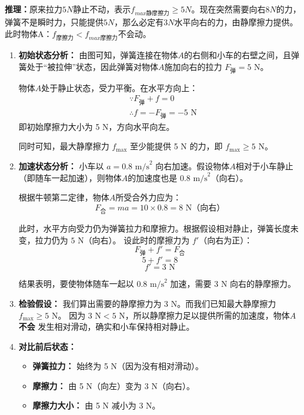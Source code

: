 \documentclass[CJKmath=true,10pt]{MyBook}
\begin{document}
\textbf{推理：}原来拉力$5N$静止不动，表示$f_{max静摩擦力}\ge 5N$。现在突然需要向右$8N$的力，弹簧不是瞬时力，只能提供$5N$，那么必定有$3N$水平向右的力，由静摩擦力提供。此时物体A：$f_{摩擦力} <  f_{max摩擦力}$不会动。
\begin{enumerate}
	
	
	\item 		\textbf{初始状态分析：}
	由图可知，弹簧连接在物体\( A \)的右侧和小车的右壁之间，且弹簧处于“被拉伸”状态，因此弹簧对物体\( A \)施加向右的拉力 \( F_{\text{弹}} = 5 \text{ N} \)。
	
	物体\( A \)处于静止状态，受力平衡。在水平方向上：
	\begin{align*}
		&\because F_{\text{弹}} + f = 0 \\
		&\therefore f = -F_{\text{弹}} = -5 \text{ N}
	\end{align*}
	即初始摩擦力大小为 5 N，方向水平向左。
	
	同时可知，最大静摩擦力 \( f_{\max} \) 至少能提供 5 N 的力，即 \( f_{\max} \geq 5 \text{ N} \)。
	
	\item 		\textbf{加速状态分析：}
	小车以 \( a = 0.8 \text{ m/s}^2 \) 向右加速。假设物体\( A \)相对于小车静止（即随车一起加速），则物体\( A \)的加速度也是 \( 0.8 \text{ m/s}^2 \)（向右）。
	
	根据牛顿第二定律，物体\( A \)所受合外力应为：
	\[ F_{\text{合}} = ma = 10 \times 0.8 = 8 \text{ N} \text{（向右）} \]
	
	此时，水平方向受力仍为弹簧拉力和摩擦力。根据假设相对静止，弹簧长度未变，拉力仍为 \( 5 \text{ N} \)（向右）。
	设此时的摩擦力为 \( f' \)（向右为正）：
	\[ F_{\text{弹}} + f' = F_{\text{合}} \]
	\[ 5 + f' = 8 \]
	\[ f' = 3 \text{ N} \]
	
	结果表明，要使物体随车一起以 \( 0.8 \text{ m/s}^2 \) 加速，需要 3 N 向右的静摩擦力。
	
	\item 		\textbf{检验假设：}
	我们算出需要的静摩擦力为 3 N。而我们已知最大静摩擦力 \( f_{\max} \geq 5 \text{ N} \)。
	因为 \( 3 \text{ N} < 5 \text{ N} \)，所以静摩擦力足以提供所需的加速度，物体\( A \) \textbf{不会} 发生相对滑动，确实和小车保持相对静止。
	
	\item 		\textbf{对比前后状态：}
	\begin{itemize}
		\item \textbf{弹簧拉力：} 始终为 5 N（因为没有相对滑动）。
		\item \textbf{摩擦力：} 由 5 N（向左）变为 3 N（向右）。
		\item \textbf{摩擦力大小：} 由 5 N 减小为 3 N。
	\end{itemize}
	

\end{enumerate}
\end{document}
